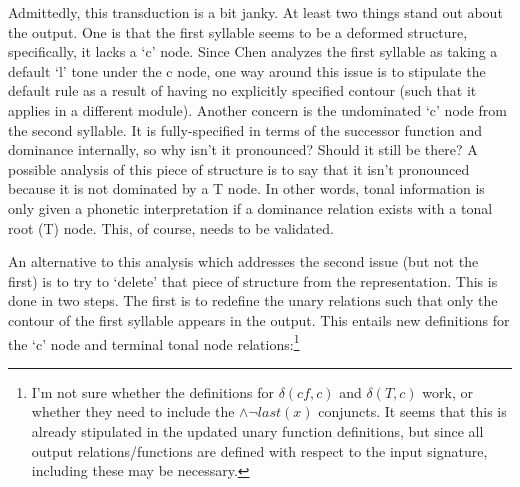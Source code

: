 \documentclass{article}
\begin{document}
\begin{center}
\end{center}
Admittedly, this transduction is a bit janky. At least two things stand out about the output. One is that the first syllable seems to be a deformed structure, specifically, it lacks a `c' node. Since Chen analyzes the first syllable as taking a default `l' tone under the c node, one way around this issue is to stipulate the default rule as a result of having no explicitly specified contour (such that it applies in a different module). Another concern is the undominated `c' node from the second syllable. It is fully-specified in terms of the successor function and dominance internally, so why isn't it pronounced? Should it still be there? A possible analysis of this piece of structure is to say that it isn't pronounced because it is not dominated by a T node. In other words, tonal information is only given a phonetic interpretation if a dominance relation exists with a tonal root (T) node. This, of course, needs to be validated. \par
An alternative to this analysis which addresses the second issue (but not the first) is to try to `delete' that piece of structure from the representation. This is done in two steps. The first is to redefine the unary relations such that only the contour of the first syllable appears in the output. This entails new definitions for the `c' node and terminal tonal node relations:\footnote{I'm not sure whether the definitions for $\delta(cf,c)$ and $\delta(T,c)$ work, or whether they need to include the $\land \neg last(x)$ conjuncts. It seems that this is already stipulated in the updated unary function definitions, but since all output relations/functions are defined with respect to the input signature, including these may be necessary.}
\end{document}
